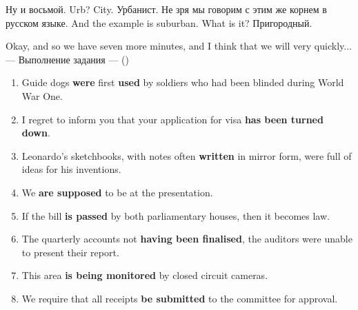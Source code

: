 \documentclass[main.tex]{subfiles}
\begin{document}
Ну и восьмой. Urb?
City. Урбанист.
Не зря мы говорим с этим же корнем в русском языке.
And the example is suburban.
What is it? Пригородный.

\newpage
{}

Okay, and so we have seven more minutes, and I think that we will very quickly...
\\

\hypertarget{ltask:2023-11-22-2}{--- Выполнение задания ---} (\hyperref[task:2023-11-22]{\color{blue}{перейти к тексту задания}})
\\


\begin{enumerate}[nosep,leftmargin=10mm]
	\itemsep\eitsp
	\setcounter{enumi}{28}
	\item Guide dogs \textbf{were} first \textbf{used} by soldiers who had been blinded during World War One.
	\item I regret to inform you that your application for visa \textbf{has been turned down}.
	\item Leonardo's sketchbooks, with notes often \textbf{written} in mirror form, were full of ideas for his inventions.
	\item We \textbf{are supposed} to be at the presentation.
	\item If the bill \textbf{is passed} by both parliamentary houses, then it becomes law.
	\item The quarterly accounts not \textbf{having been finalised}, the auditors were unable to present their report.
	\item This area \textbf{is being monitored} by closed circuit cameras.
	\item We require that all receipts \textbf{be submitted} to the committee for approval.
\end{enumerate}
\ 
\end{document}
